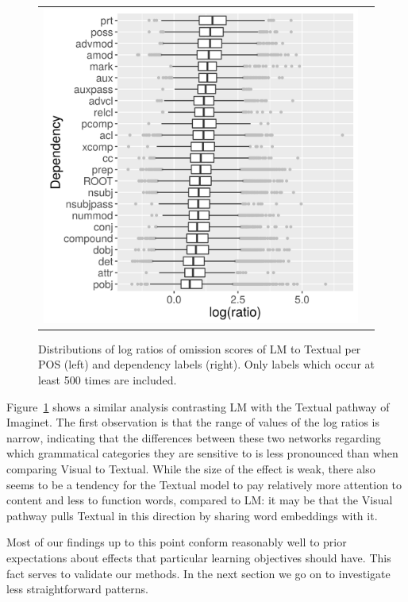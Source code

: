 \begin{figure}[t]
\begin{tabular}{cc}
  \includegraphics[scale=0.55]{imaginet-omission-quotient-dep-boxplot.png} \\  
  \end{tabular}
  \caption{Distributions of log ratios of omission scores of {\sc LM} to {\sc Textual} per
    POS (left) and dependency labels (right). Only labels which occur at least 500 times are included.}
\label{fig:omission-imaginet-quotient}
\end{figure}


Figure~\ref{fig:omission-imaginet-quotient} shows a similar analysis
contrasting {\sc LM} with the {\sc Textual} pathway of {\sc
  Imaginet}. The first observation is that the range of values of the
log ratios is narrow, indicating that the differences between these
two networks regarding which grammatical categories they are sensitive
to is less pronounced than when comparing {\sc Visual} to {\sc
  Textual}. While the size of the effect is weak, there also seems to
be a tendency for the {\sc Textual} model to pay relatively more
attention to content and less to function words, compared to
{\sc LM}: it may be that the {\sc Visual} pathway pulls {\sc Textual}
in this direction by sharing word embeddings with it.


Most of our findings up to this point conform reasonably well to prior
expectations about effects that  particular learning objectives should
have. This fact serves to validate our methods. In the next section we
go on to investigate less straightforward patterns.

